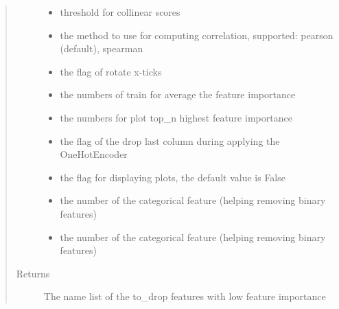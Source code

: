 \documentclass[letterpaper,11pt,english]{sphinxmanual}
\begin{document}
\begin{fulllineitems}
\begin{fulllineitems}
\begin{quote}
\begin{description}
\begin{itemize}
\item {} 
 \textendash{} threshold for collinear scores

\item {} 
 \textendash{} the method to use for computing correlation, supported: pearson (default), spearman

\item {} 
 \textendash{} the flag of rotate x-ticks

\item {} 
 \textendash{} the numbers of train for average the feature importance

\item {} 
 \textendash{} the numbers for plot top\_n highest feature importance

\item {} 
 \textendash{} the flag of the drop last column during applying the OneHotEncoder

\item {} 
 \textendash{} the flag for displaying plots, the default value is False

\item {} 
 \textendash{} the number of the categorical feature (helping removing binary features)

\item {} 
 \textendash{} the number of the categorical feature (helping removing binary features)

\end{itemize}

\item[{Returns}] \leavevmode
The name list of the to\_drop features with low feature importance

\end{description}\end{quote}

\end{fulllineitems}



\end{fulllineitems}
\end{document}
